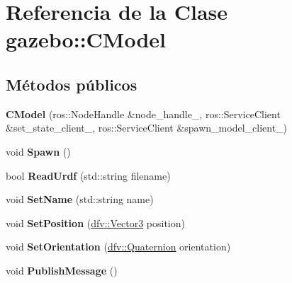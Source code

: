 \hypertarget{classgazebo_1_1CModel}{\section{\-Referencia de la \-Clase gazebo\-:\-:\-C\-Model}
\label{classgazebo_1_1CModel}
}
\subsection*{\-Métodos públicos}
\begin{DoxyCompactItemize}
\item 
\hypertarget{classgazebo_1_1CModel_abc77656ce74004124e939620937dce90}{{\bfseries \-C\-Model} (ros\-::\-Node\-Handle \&node\-\_\-handle\-\_\-, ros\-::\-Service\-Client \&set\-\_\-state\-\_\-client\-\_\-, ros\-::\-Service\-Client \&spawn\-\_\-model\-\_\-client\-\_\-)}\label{classgazebo_1_1CModel_abc77656ce74004124e939620937dce90}

\item 
\hypertarget{classgazebo_1_1CModel_a0853ca01db93fd0aa37de39bc2e25850}{void {\bfseries \-Spawn} ()}\label{classgazebo_1_1CModel_a0853ca01db93fd0aa37de39bc2e25850}

\item 
\hypertarget{classgazebo_1_1CModel_a59e7bd37364c6f6eaaa4a6a4c1ead7da}{bool {\bfseries \-Read\-Urdf} (std\-::string filename)}\label{classgazebo_1_1CModel_a59e7bd37364c6f6eaaa4a6a4c1ead7da}

\item 
\hypertarget{classgazebo_1_1CModel_acfa602b28f1972158f1611b24b45e4f6}{void {\bfseries \-Set\-Name} (std\-::string name)}\label{classgazebo_1_1CModel_acfa602b28f1972158f1611b24b45e4f6}

\item 
\hypertarget{classgazebo_1_1CModel_a49bb0ba8a0761c1259032bd74ec8507a}{void {\bfseries \-Set\-Position} (\hyperlink{classdfv_1_1Vector3}{dfv\-::\-Vector3} position)}\label{classgazebo_1_1CModel_a49bb0ba8a0761c1259032bd74ec8507a}

\item 
\hypertarget{classgazebo_1_1CModel_a284d4bd80d81a17f696875905c453b72}{void {\bfseries \-Set\-Orientation} (\hyperlink{classdfv_1_1Quaternion}{dfv\-::\-Quaternion} orientation)}\label{classgazebo_1_1CModel_a284d4bd80d81a17f696875905c453b72}

\item 
\hypertarget{classgazebo_1_1CModel_a5f56be13a9306c595ee8fc98b6efc2ae}{void {\bfseries \-Publish\-Message} ()}\label{classgazebo_1_1CModel_a5f56be13a9306c595ee8fc98b6efc2ae}


\end{DoxyCompactItemize}
